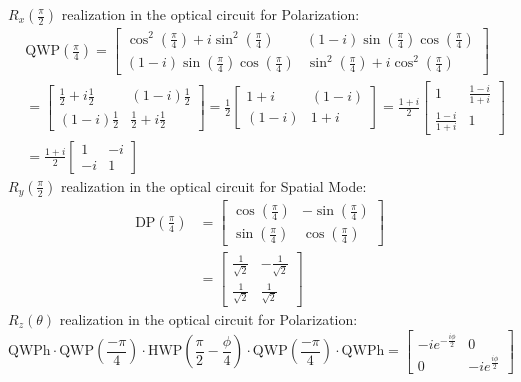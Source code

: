 \documentclass{article}
\begin{document}
$R_x(\frac{\pi}{2})$ realization in the optical circuit for Polarization:
\begin{align*}
	&\text{QWP}(\frac{\pi}{4})= 
	\begin{bmatrix}
		\cos^2 (\frac{\pi}{4}) + i \sin^2 (\frac{\pi}{4}) & (1-i) \sin(\frac{\pi}{4})\cos(\frac{\pi}{4})     \\
		(1-i) \sin(\frac{\pi}{4})\cos(\frac{\pi}{4})      & \sin^2 (\frac{\pi}{4}) + i \cos^2(\frac{\pi}{4})
	\end{bmatrix} \\[2ex]
	&= \begin{bmatrix}
		\frac{1}{2} + i \frac{1}{2} & (1-i) \frac{1}{2} \\
		(1-i) \frac{1}{2}          & \frac{1}{2} + i \frac{1}{2}
	\end{bmatrix} = 
	\frac{1}{2} 
	\begin{bmatrix}
		1+i & (1-i) \\
		(1-i) & 1+i
	\end{bmatrix} = \frac{1+i}{2}
	\begin{bmatrix}
		1 & \frac{1-i}{1+i}\\
		\frac{1-i}{1+i} & 1
	\end{bmatrix} \\[2ex]
	&= \frac{1+i}{2}
	\begin{bmatrix}
		1 & -i \\
		-i & 1
	\end{bmatrix}
\end{align*}
$R_y(\frac{\pi}{2})$ realization in the optical circuit for Spatial Mode:
\begin{align*}
	\text{DP}(\frac{\pi}{4}) &= \begin{bmatrix}
		\cos(\frac{\pi}{4}) & -\sin(\frac{\pi}{4}) \\
		\sin(\frac{\pi}{4}) & \cos(\frac{\pi}{4})
	\end{bmatrix} \\[2ex]
	&= \begin{bmatrix}
		\frac{1}{\sqrt{2}} & -\frac{1}{\sqrt{2}} \\
		\frac{1}{\sqrt{2}} & \frac{1}{\sqrt{2}}
	\end{bmatrix}
\end{align*}
$R_z(\theta)$ realization in the optical circuit for Polarization:
\[\text{QWPh} \cdot \text{QWP}(\frac{-\pi}{4}) \cdot \text{HWP}(\frac{\pi}{2} - \frac{\phi}{4}) \cdot \text{QWP}(\frac{-\pi}{4}) \cdot \text{QWPh} = \begin{bmatrix}
	-ie^{-\frac{i\phi}{2}} & 0 \\
	0 & -ie^{\frac{i\phi}{2}}
\end{bmatrix}\]
\end{document}
